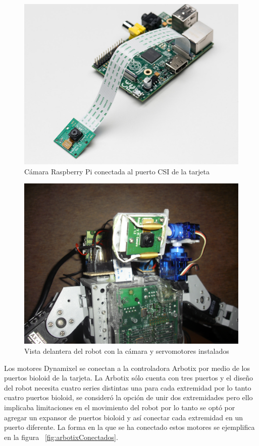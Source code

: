 \begin{figure}[hbtp]
\centering
\includegraphics[scale=0.6]{imagenes/raspbCam.jpg}
\caption{C\'amara Raspberry Pi conectada al puerto CSI de la tarjeta}
\label{fig:camACSI}
\end{figure}
 
\begin{figure}[hbtp]
\centering
\includegraphics[scale=0.08]{imagenes/servosYcamara.JPG}
\caption{Vista delantera del robot con la cámara y servomotores instalados}
\label{fig:servosycam}
\end{figure}

Los motores Dynamixel se conectan a la controladora Arbotix por medio de los puertos bioloid de la tarjeta. La Arbotix s\'olo cuenta con tres puertos y el diseño del robot necesita cuatro series distintas 
una para cada extremidad por lo tanto cuatro puertos bioloid, se consideró la opción de unir dos extremidades pero ello implicaba limitaciones en el movimiento del robot por lo tanto se optó por agregar un expansor de puertos bioloid y así conectar cada extremidad en un puerto diferente. La forma en la que se ha conectado estos motores se ejemplifica en la figura ~\ref{fig:arbotixConectados}. 

